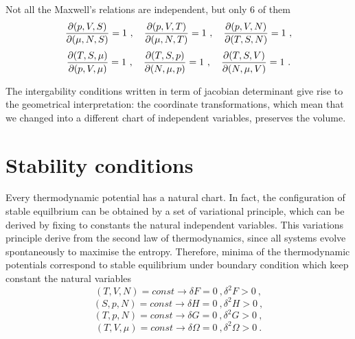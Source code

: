     Not all the Maxwell's relations are independent, but only $6$ of them 
    \begin{equation*}
        \frac{\partial(p, V, S)}{\partial(\mu, N, S)} = 1 ~, \quad \frac{\partial(p, V, T)}{\partial(\mu, N, T)} = 1 ~, \quad \frac{\partial(p, V, N)}{\partial(T, S, N)} = 1 ~, 
    \end{equation*}
    \begin{equation*}
        \frac{\partial(T, S, \mu)}{\partial(p, V, \mu)} = 1 ~, \quad \frac{\partial(T, S, p)}{\partial(N, \mu, p)} = 1 ~, \quad \frac{\partial(T, S, V)}{\partial(N, \mu, V)} = 1 ~.
    \end{equation*}

    The intergability conditions written in term of jacobian determinant give rise to the geometrical interpretation: the coordinate transformations, which mean that we changed into a different chart of independent variables, preserves the volume.

\section{Stability conditions}

    Every thermodynamic potential has a natural chart. In fact, the configuration of stable equilbrium can be obtained by a set of variational principle, which can be derived by fixing to constants the natural independent variables. This variations principle derive from the second law of thermodynamics, since all systems evolve spontaneously to maximise the entropy. Therefore, minima of the thermodynamic potentials correspond to stable equilibrium under boundary condition which keep constant the natural variables
    \begin{equation*}
        (T, V, N) = const \rightarrow \delta F = 0 ~, \delta^2 F > 0 ~, 
    \end{equation*}
    \begin{equation*}
        (S, p, N) = const \rightarrow \delta H = 0 ~, \delta^2 H > 0 ~, 
    \end{equation*}
    \begin{equation*}
        (T, p, N) = const \rightarrow \delta G = 0 ~, \delta^2 G > 0 ~, 
    \end{equation*}
    \begin{equation*}
        (T, V, \mu) = const \rightarrow \delta \Omega = 0 ~, \delta^2 \Omega > 0 ~.
    \end{equation*}

